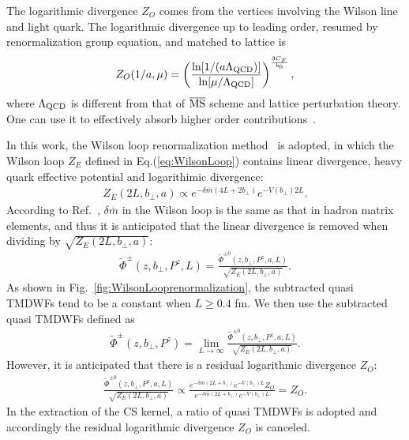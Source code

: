 \documentclass[prd,aps,twocolumn,preprintnumbers, showpacs, nofootinbib,superscriptaddress,notitlepage]{revtex4-1}
\newcommand\bl{\color{blue}}
\begin{document}
The logarithmic divergence $Z_{O}$ comes from the vertices
involving the Wilson line and light quark. The logarithmic  divergence up to leading order, resumed by renormalization group equation, and matched to lattice is~\cite{Ji:1991pr, LatticePartonCollaborationLPC:2021xdx} 
\begin{align}\label{eq:ZO_RS_higher}
Z_{O}(1/a, \mu)=\left(\frac{\ln [1 /(a \Lambda_{\rm QCD})]}{\ln [\mu / \Lambda_{\rm QCD}]}\right)^{\frac{3 C_{F}}{b_0}},\nonumber\\
\end{align}
where $\Lambda_{\rm QCD}$  is different from that of $\overline{\rm MS}$ scheme and lattice perturbation theory. One can use it to effectively absorb higher order contributions~\cite{Lepage:1992xa}.

In this work,  the Wilson loop renormalization method~\cite{Chen:2016fxx,Zhang:2017bzy,Musch:2010ka,Green:2017xeu,Zhang:2017zfe}  is adopted, in which the Wilson loop $Z_E$ defined in Eq.(\ref{eq:WilsonLoop})  contains linear divergence, heavy quark effective potential and logarithimic divergence:
\begin{align}
Z_E\left(2L, b_{\perp}, a\right) \propto e^{-\delta \bar{m}(4L+2b_{\perp})}e^{-V(b_{\perp})2L}.
\end{align}
According to Ref.~\cite{LatticePartonCollaborationLPC:2021xdx}, $\delta \bar{m}$ in {\bl the Wilson loop is the same as that in hadron matrix elements, and thus it is anticipated that the linear divergence is removed when dividing by} $\sqrt{Z_E\left(2L, b_{\perp}, a\right)}$:
\begin{align}
\tilde{\Phi}^{\pm}(z,b_{\perp},P^z,L)=\frac{\tilde{\Phi}^{\pm0}\left(z,b_{\perp},P^z,a,L\right)}{\sqrt{Z_E\left(2L, b_{\perp}, a\right)}}.
\end{align}
As shown in Fig.~\ref{fig:WilsonLooprenormalization}, the subtracted quasi TMDWFs tend  to  be a constant when  $L\ge 0.4$ fm. We then use the subtracted quasi TMDWFs {\bl defined} as
\begin{align}\label{eq:WLRQuasi}
\tilde{\Phi}^{\pm}(z,b_{\perp},P^z)=\lim_{L\to\infty}\frac{\tilde{\Phi}^{\pm0}\left(z,b_{\perp},P^z,a,L\right)}{\sqrt{Z_E\left(2L, b_{\perp}, a\right)}}.
\end{align}
{\bl However,} it is anticipated that there is a residual logarithmic divergence $Z_{O}$:
\begin{align}
\frac{\tilde{\Phi}^{\pm0}\left(z,b_{\perp},P^z,a,L\right)}{\sqrt{Z_E\left(2L, b_{\perp}, a\right)}}
\propto \frac{e^{-\delta \bar{m}(2L+b_{\perp})}e^{-V(b_{\perp})L}Z_{O}}{e^{-\delta \bar{m}(2L+b_{\perp})}e^{-V(b_{\perp})L}}
= Z_{O}.
\end{align}
In the extraction of {\bl the} CS kernel, a ratio of quasi TMDWFs is adopted and accordingly the residual logarithmic divergence $Z_{O}$ is canceled.
\end{document}
